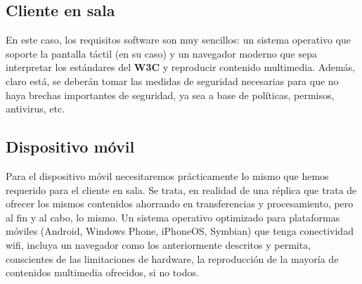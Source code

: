 \subsection{Cliente en sala}

\par En este caso, los requisitos software son muy sencillos: un sistema operativo que soporte la pantalla táctil (en su caso) y un navegador moderno que sepa interpretar los estándares del \textbf{W3C} y reproducir contenido multimedia. Además, claro está, se deberán tomar las medidas de seguridad necesarias para que no haya brechas importantes de seguridad, ya sea a base de políticas, permisos, antivirus, etc.

\subsection{Dispositivo móvil}

\par Para el dispositivo móvil necesitaremos prácticamente lo mismo que hemos requerido para el cliente en sala. Se trata, en realidad de una réplica que trata de ofrecer los mismos contenidos ahorrando en transferencias y procesamiento, pero al fin y al cabo, lo mismo. Un sistema operativo optimizado para plataformas móviles (Android, Windows Phone, iPhoneOS, Symbian) que tenga conectividad wifi, incluya un navegador como los anteriormente descritos y permita, conscientes de las limitaciones de hardware, la reproducción de la mayoría de contenidos multimedia ofrecidos, si no todos.